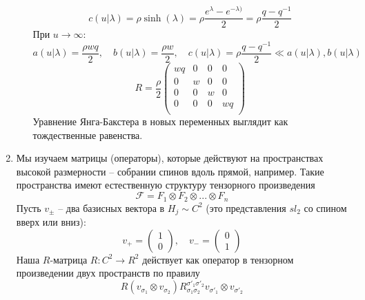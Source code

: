 \documentclass[12pt]{article}
\theoremstyle{definition}
\begin{document}
\begin{enumerate}
\begin{itemize}
\begin{equation}
        \end{equation}
        \begin{equation}
            c(u|\lambda)=\rho\sinh(\lambda)=\rho\frac{e^{\lambda}-e^{-\lambda)}}{2}=\rho\frac{q-q^{-1}}{2}
        \end{equation}
        При $u\rightarrow\infty$:
        \begin{equation}
            a(u|\lambda)=\frac{\rho wq}{2},\quad b(u|\lambda)=\frac{\rho w}{2},\quad c(u|\lambda)=\rho\frac{q-q^{-1}}{2}\ll a(u|\lambda),b(u|\lambda)
        \end{equation}
        \begin{equation}
            \boxed{R=\frac{\rho}{2}\begin{pmatrix}
                wq & 0 & 0 & 0\\
                0 & w & 0 & 0\\
                0 & 0 & w & 0\\
                0 & 0 & 0 & wq\\
            \end{pmatrix}}
        \end{equation}
        Уравнение Янга-Бакстера в новых переменных выглядит как тождественные равенства.
    \end{itemize}
    \item Мы изучаем матрицы (операторы), которые действуют на пространствах высокой размерности -- собрании спинов вдоль прямой, например. Такие пространства имеют естественную структуру тензорного произведения
    \begin{equation}
        \mathcal{F}=F_1\otimes F_2\otimes...\otimes F_n
    \end{equation}
    Пусть $v_\pm$ -- два базисных вектора в $H_j\sim C^2$ (это представления $sl_2$ со спином вверх или вниз):
    \begin{equation}
        v_+=\begin{pmatrix}
            1\\
            0
        \end{pmatrix},\quad v_-=\begin{pmatrix}
            0\\
            1
        \end{pmatrix}
    \end{equation}
    Наша $R$-матрица $R:C^2\rightarrow R^2$ действует как оператор в тензорном произведении двух пространств по правилу
    \begin{equation}
        R(v_{\sigma_1}\otimes v_{\sigma_2})R^{\sigma'_1\sigma'_2}_{\sigma_1\sigma_2}v_{\sigma'_1}\otimes v_{\sigma'_2}

\end{equation}
\end{enumerate}
\end{document}
